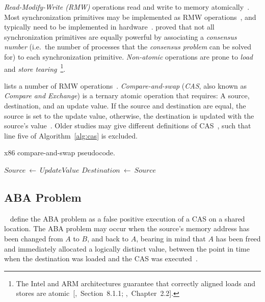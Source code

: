 \emph{Read-Modify-Write (RMW)} operations read and write to memory
atomically~\citep{perfbook2021}. Most synchronization primitives may be
implemented as RMW operations~\citep[Section~5.6]{herlihy2020art}, and
typically need to be implemented in hardware~\citep[Appendix~B.8]{herlihy2020art}.
\citeauthor{herlihy1991wait} proved that not all synchronization primitives are
equally powerful by associating a \emph{consensus number} (i.e.~the number of
processes that the \emph{consensus problem} can be solved for) to each
synchronization primitive. \emph{Non-atomic} operations are prone to \emph{load} and \emph{store
tearing}~\citep[Section~4.3.4]{perfbook2021}\footnote{The Intel and ARM
architectures guarantee that correctly aligned loads and stores are
atomic~[\citealp{intel2021system},~Section~8.1.1;
\citealp{arm2022architecture},~Chapter~2.2].}.

\citeauthor{scott2013shared} lists a number of RMW operations~\citep[Table~2.2]{scott2013shared}.
\emph{Compare-and-swap} (\emph{CAS}, also known as \emph{Compare and Exchange})
is a ternary atomic operation that requires: A source, destination, and an
update value. If the source and destination are equal, the source is set to the
update value, otherwise, the destination is updated with the source's
value~\citep{intel2021inst}.
Older studies may give different definitions of
CAS~\citetext{\citealp{scott2013shared},~Table~2.2;~\citealp{valois1995datastructures},~Appendix~A},
such that line five of Algorithm~\ref{alg:cas} is excluded.

\SetNoFillComment
{}
\begin{algorithm}[hbt!]
    \caption{x86 compare-and-swap pseudocode.}\label{alg:cas}
        {
            $Source~\gets~UpdateValue$\;
            \;
        }
        $Destination~\gets~Source$\label{alg:line:sourceneqdest}\;
        \;
\end{algorithm}

\subsection{ABA Problem}
\citeauthor{dechev2010understanding}~\citep{dechev2010understanding} define the ABA problem as a false positive
execution of a CAS on a shared location. The ABA
problem may occur when the source's memory address has been changed from $A$ to
$B$, and back to $A$, bearing in mind that $A$ has been freed and immediately
allocated a logically distinct value, between the point in time when the
destination was loaded and the CAS was executed~\citep{dechev2010understanding}.


